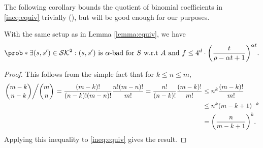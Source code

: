 \begin{remark}
\end{remark}

The following corollary bounds the quotient of binomial coefficients in \eqref{ineq:equiv}
trivially (), but will be good enough for our purposes.

\begin{corollary}\label{corollary:equiv}
  With the same setup as in Lemma \ref{lemma:equiv}, we have
  \begin{equation}\label{ineq:corollary:equiv}
    \prob*{\exists (s,s') \in \setSK^{2} : (s,s') \text{ is \(\alpha\)-bad for } S \text{ w.r.t \(A\) and \(f\)}}
    \le 4^{d} \cdot \left( \frac{t}{\rho - \alpha t + 1} \right)^{\alpha t}.
  \end{equation}
\end{corollary}

\begin{proof}
  This follows from the simple fact that for \(k \le n \le m\),
  \begin{align}
    \left. \binom{m - k}{n - k} \middle/ \binom{m}{n} \right.
    = \frac{(m-k)!}{(n-k)!(m-n)!} \frac{n!(m-n)!}{m!}
    = \frac{n!}{(n-k)!} \frac{(m-k)!}{m!} \notag
    & \le n^{k} \frac{(m-k)!}{m!} \notag\\
    & \le n^{k} (m-k+1)^{-k} \notag\\
    & = \left( \frac{n}{m - k + 1} \right)^{k}. \notag
  \end{align}
  Applying this inequality to \eqref{ineq:equiv} gives the result.
\end{proof}

